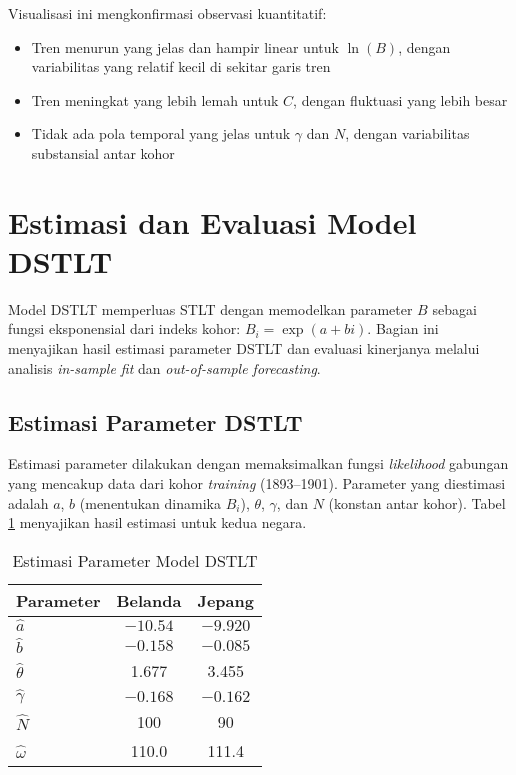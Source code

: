 Visualisasi ini mengkonfirmasi observasi kuantitatif:
\begin{itemize}
    \item Tren menurun yang jelas dan hampir linear untuk $\ln(B)$, dengan variabilitas yang relatif kecil di sekitar garis tren
    \item Tren meningkat yang lebih lemah untuk $C$, dengan fluktuasi yang lebih besar
    \item Tidak ada pola temporal yang jelas untuk $\gamma$ dan $N$, dengan variabilitas substansial antar kohor
\end{itemize}


\section{Estimasi dan Evaluasi Model DSTLT}

Model DSTLT memperluas STLT dengan memodelkan parameter $B$ sebagai fungsi eksponensial dari indeks kohor: $B_i = \exp(a + bi)$. Bagian ini menyajikan hasil estimasi parameter DSTLT dan evaluasi kinerjanya melalui analisis \textit{in-sample fit} dan \textit{out-of-sample forecasting}.

\subsection{Estimasi Parameter DSTLT}

Estimasi parameter dilakukan dengan memaksimalkan fungsi \textit{likelihood} gabungan yang mencakup data dari kohor \textit{training} (1893--1901). Parameter yang diestimasi adalah $a$, $b$ (menentukan dinamika $B_i$), $\theta$, $\gamma$, dan $N$ (konstan antar kohor). Tabel \ref{tab:dstlt_parameters} menyajikan hasil estimasi untuk kedua negara.

\begin{table}[htbp]
\centering
\caption{Estimasi Parameter Model DSTLT}
\label{tab:dstlt_parameters}
\begin{tabular}{lcc}
\hline
\textbf{Parameter} & \textbf{Belanda} & \textbf{Jepang} \\
\hline
$\hat{a}$ & $-10.54$ & $-9.920$ \\
$\hat{b}$ & $-0.158$ & $-0.085$ \\
$\hat{\theta}$ & 1.677 & 3.455 \\
$\hat{\gamma}$ & $-0.168$ & $-0.162$ \\
$\hat{N}$ & 100 & 90 \\
$\hat{\omega}$ & 110.0 & 111.4 \\
\hline
\end{tabular}
\end{table}

